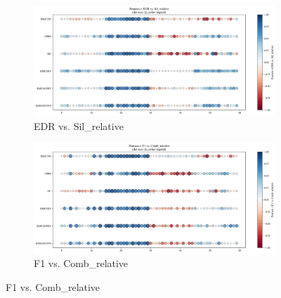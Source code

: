 \documentclass[10pt]{article} %
\numberwithin{equation}{section}
\begin{document}
\begin{enumerate}[label=(\alph*)]
\begin{figure}[htbp]
    \begin{subfigure}[b]{0.45\linewidth}
        \centering
        \includegraphics[width=\linewidth]{figures/point graph/dot_EDR_vs_Sil_relative_sorted.pdf}
        \caption{EDR vs. Sil\_relative}
        \label{fig:dot_edr_sil}
    \end{subfigure}
    \hfill
    \begin{subfigure}[b]{0.45\linewidth}
        \centering
        \includegraphics[width=\linewidth]{figures/point graph/dot_F1_vs_Comb_relative_sorted.pdf}
        \caption{F1 vs. Comb\_relative}
        \label{fig:dot_f1_comb}
    \end{subfigure}

    \vspace{1em}


\end{figure}
\end{enumerate}
\end{document}
